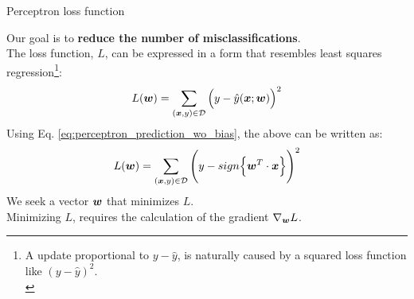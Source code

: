 %
%
%

\begin{frame}[t]{Perceptron loss function}

    Our goal is to {\bf reduce the number of misclassifications}.\\
    \vspace{0.3cm}
    The \gls{loss function}, $L$,
    can be expressed in a form that resembles 
    \gls{least squares} 
    \gls{regression}\footnote{
        A  
      update proportional to $y-\hat{y}$, 
      is naturally caused by a squared loss function like $(y-\hat{y})^2$.\\
    }:\\
    \begin{equation}
        L(\boldsymbol{w}) = 
        \sum_{(\boldsymbol{x},y) \in \mathcal{D}} 
        \Big(y - \hat{y}(\boldsymbol{x};\boldsymbol{w})\Big)^2 
        \label{eq:percepton_leastsquares_loss_1}  
    \end{equation}
    Using Eq. \ref{eq:perceptron_prediction_wo_bias}, the above can be written as:
    \begin{equation}
        L(\boldsymbol{w}) = 
        \sum_{(\boldsymbol{x},y) \in \mathcal{D}} 
        \Bigg(y - sign\Big\{ \boldsymbol{w}^T \cdot \boldsymbol{x} \Big\}\Bigg)^2
        \label{eq:percepton_leastsquares_loss_2}  
    \end{equation}
    \vspace{0.3cm}
    We seek a vector $\boldsymbol{w}$ that minimizes $L$. \\
    Minimizing $L$, requires the calculation of the gradient $\nabla_{\boldsymbol{w}} L$.

\end{frame}

%
%
%

